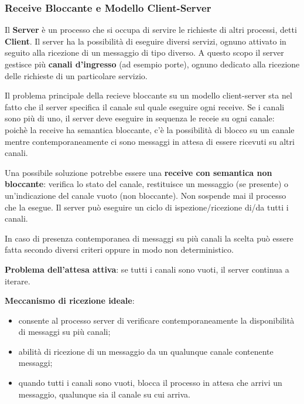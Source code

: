 \documentclass{article}
\begin{document}
\subsubsection{Receive Bloccante e Modello Client-Server}
Il \textbf{Server} è un processo che si occupa di servire le richieste di altri processi, detti \textbf{Client}. Il server ha la possibilità di eseguire diversi servizi, ognuno attivato in seguito
alla ricezione di un messaggio di tipo diverso. A questo scopo il server gestisce più \textbf{canali d'ingresso} (ad esempio porte), ognuno dedicato alla ricezione delle richieste di
un particolare servizio.

\vspace{3mm}
Il problema principale della recieve bloccante su un modello client-server sta nel fatto che il server specifica il canale sul quale eseguire ogni receive. Se i canali sono più di uno, il server
deve eseguire in sequenza le receie su ogni canale: poichè la receive ha semantica bloccante, c'è la possibilità di blocco su un canale mentre contemporaneamente ci sono messaggi in attesa di essere
ricevuti su altri canali.

\vspace{3mm}
Una possibile soluzione potrebbe essere una \textbf{receive con semantica non bloccante}: verifica lo stato del canale, restituisce un messaggio (se presente) o un'indicazione del canale vuoto
(non bloccante). Non sospende mai il processo che la esegue. Il server può eseguire un ciclo di ispezione/ricezione di/da tutti i canali.

In caso di presenza contemporanea di messaggi su più canali la scelta può essere fatta secondo diversi criteri oppure in modo non deterministico.

\textbf{Problema dell'attesa attiva}: se tutti i canali sono vuoti, il server continua a iterare.

\vspace{3mm}
\textbf{Meccanismo di ricezione ideale}:
\begin{itemize}
    \item consente al processo server di verificare contemporaneamente la disponibilità di messaggi su più canali;
    \item abilità di ricezione di un messaggio da un qualunque canale contenente messaggi;
    \item quando tutti i canali sono vuoti, blocca il processo in attesa che arrivi un messaggio, qualunque sia il canale su cui arriva.
\end{itemize}
\end{document}
